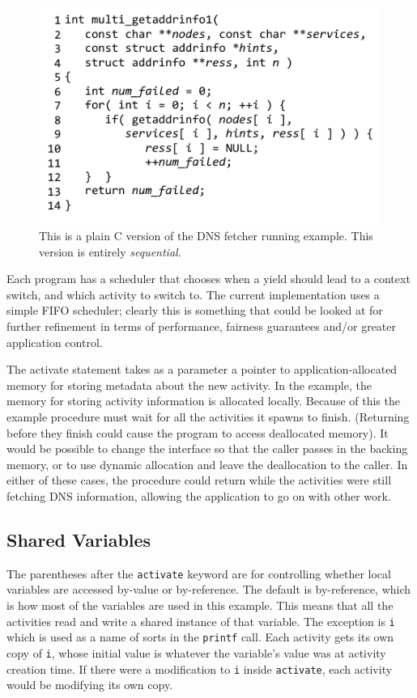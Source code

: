 \documentclass[sigplan,10pt,review,anonymous]{acmart}\settopmatter{printfolios=true,printccs=false,printacmref=false}
\begin{document}
\begin{figure}
\includegraphics{multi_getaddrinfo_seq}
\caption{This is a plain C version of the DNS fetcher running example.
  This version is entirely \emph{sequential}.}
\label{fig:charcoal_multidns_seq}
\end{figure}

Each \charcoal{} program has a scheduler that chooses when a yield should lead to a context switch, and which activity to switch to.
The current \charcoal{} implementation uses a simple FIFO scheduler; clearly this is something that could be looked at for further refinement in terms of performance, fairness guarantees and/or greater application control.

The activate statement takes as a parameter a pointer to application-allocated memory for storing metadata about the new activity.
In the example, the memory for storing activity information is allocated locally.
Because of this the example procedure must wait for all the activities it spawns to finish.
(Returning before they finish could cause the program to access deallocated memory).
It would be possible to change the interface so that the caller passes in the backing memory, or to use dynamic allocation and leave the deallocation to the caller.
In either of these cases, the procedure could return while the activities were still fetching DNS information, allowing the application to go on with other work.

\subsection{Shared Variables}

The parentheses after the \texttt{activate} keyword are for controlling whether local variables are accessed by-value or by-reference.
The default is by-reference, which is how most of the variables are used in this example.
This means that all the activities read and write a shared instance of that variable.
The exception is \texttt{i} which is used as a name of sorts in the \texttt{printf} call.
Each activity gets its own copy of \texttt{i}, whose initial value is whatever the variable's value was at activity creation time.
If there were a modification to \texttt{i} inside \texttt{activate}, each activity would be modifying its own copy.
\end{document}
